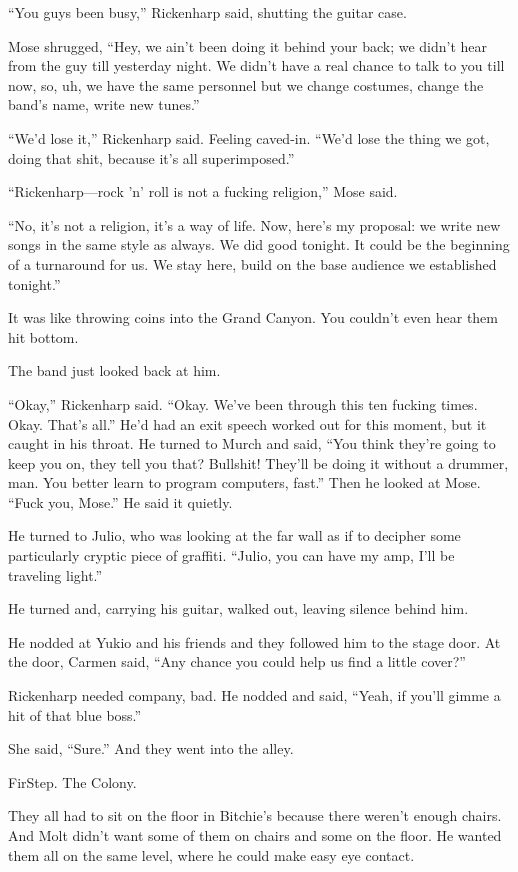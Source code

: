 “You guys been busy,” Rickenharp said, shutting the guitar case.

Mose shrugged, “Hey, we ain’t been doing it behind your back; we didn’t hear from the guy till yesterday night. We didn’t have a real chance to talk to you till now, so, uh, we have the same personnel but we change costumes, change the band’s name, write new tunes.”

“We’d lose it,” Rickenharp said. Feeling caved-in. “We’d lose the thing we got, doing that shit, because it’s all superimposed.”

“Rickenharp—rock ’n’ roll is not a fucking religion,” Mose said.

“No, it’s not a religion, it’s a way of life. Now, here’s my proposal: we write new songs in the same style as always. We did good tonight. It could be the beginning of a turnaround for us. We stay here, build on the base audience we established tonight.”

It was like throwing coins into the Grand Canyon. You couldn’t even hear them hit bottom.

The band just looked back at him.

“Okay,” Rickenharp said. “Okay. We’ve been through this ten fucking times. Okay. That’s all.” He’d had an exit speech worked out for this moment, but it caught in his throat. He turned to Murch and said, “You think they’re going to keep you on, they tell you that? Bullshit! They’ll be doing it without a drummer, man. You better learn to program computers, fast.” Then he looked at Mose. “Fuck you, Mose.” He said it quietly.

He turned to Julio, who was looking at the far wall as if to decipher some particularly cryptic piece of graffiti. “Julio, you can have my amp, I’ll be traveling light.”

He turned and, carrying his guitar, walked out, leaving silence behind him.

He nodded at Yukio and his friends and they followed him to the stage door. At the door, Carmen said, “Any chance you could help us find a little cover?”

Rickenharp needed company, bad. He nodded and said, “Yeah, if you’ll gimme a hit of that blue boss.”

She said, “Sure.” And they went into the alley.

FirStep. The Colony.

They all had to sit on the floor in Bitchie’s because there weren’t enough chairs. And Molt didn’t want some of them on chairs and some on the floor. He wanted them all on the same level, where he could make easy eye contact.

